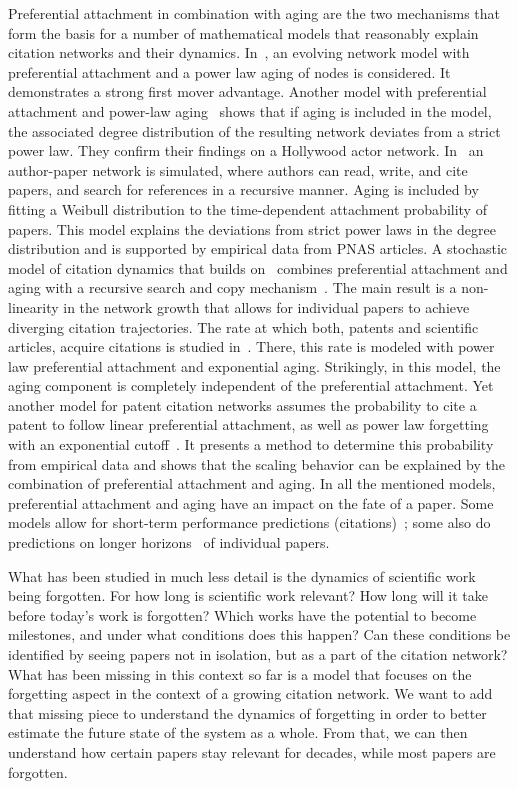 \documentclass[draft,final]{vutinfth} %
\begin{document}
Preferential attachment in combination with aging are the two mechanisms that form the basis for a number of mathematical models that reasonably explain citation networks and their dynamics. In~\cite{Dorogovtsev2000}, an evolving network model with preferential attachment and a power law aging of nodes is considered. It demonstrates a strong first mover advantage. Another model with preferential attachment and power-law aging~\cite{Safdari2016} shows that if aging is included in the model, the associated degree distribution of the resulting network deviates from a strict power law. They confirm their findings on a Hollywood actor network. In~\cite{Borner2004} an author-paper network is simulated, where authors can read, write, and cite papers, and search for references in a recursive manner. Aging is included by fitting a Weibull distribution to the time-dependent attachment probability of papers. This model explains the deviations from strict power laws in the degree distribution and is supported by empirical data from PNAS articles. A stochastic model of citation dynamics that builds on~\cite{Borner2004} combines preferential attachment and aging with a recursive search and copy mechanism~\cite{Golosovsky2017}. The main result is a non-linearity in the network growth that allows for individual papers to achieve diverging citation trajectories.  The rate at which both, patents and scientific articles, acquire citations is studied in~\cite{Higham2017, Higham2017_2}. There, this rate is modeled with power law preferential attachment and exponential aging. Strikingly, in this model, the aging component is completely independent of the preferential attachment.  Yet another model for patent citation networks assumes the probability to cite a patent to follow linear preferential attachment, as well as power law forgetting with an exponential cutoff~\cite{Valverde2007}. It presents a method to determine this probability from empirical data and shows that the scaling behavior can be explained by the combination of preferential attachment and aging. In all the mentioned models, preferential attachment and aging have an impact on the fate of a paper. Some models allow for short-term performance predictions (citations)~\cite{Newman_2014x, Golosovsky2017, Higham2017_2}; some also do  predictions on longer horizons~\cite{Wang2013x} of individual papers. 

What has been studied in much less detail is the dynamics of scientific work being forgotten. For how long is scientific work relevant?  How long will it take before today’s work is forgotten? Which works have the potential to become milestones, and under what conditions does this happen? Can these conditions be identified by seeing papers not in isolation, but as a part of the citation network? 
What has been missing in this context so far is a model that focuses on the forgetting aspect in the context of a growing citation network. We want to add that missing piece to understand the dynamics of forgetting in order to better estimate the future state of the system as a whole. From that, we can then understand how certain papers stay relevant for  decades, while most papers are forgotten.
\end{document}
